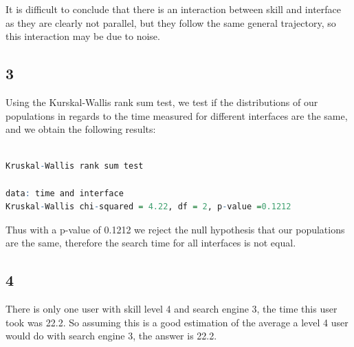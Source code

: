 \documentclass{article}
\begin{document}
	It is difficult to conclude that there is an interaction between skill and interface as they are clearly not parallel, but they follow the same general trajectory, so this interaction may be due to noise. 
    \subsection*{3}
    Using the Kurskal-Wallis rank sum test, we test if the distributions of our populations in regards to the time measured for different interfaces are the same, and we obtain the following results:\\\\
      \begin{lstlisting}[language=R]
Kruskal-Wallis rank sum test

data: time and interface
Kruskal-Wallis chi-squared = 4.22, df = 2, p-value =0.1212
      \end{lstlisting}
      Thus with a p-value of 0.1212 we reject the null hypothesis that our populations are the same, therefore the search time for all interfaces is not equal.
    \subsection*{4}
      There is only one user with skill level 4 and search engine 3, the time this user took was 22.2.
      So assuming this is a good estimation of the average a level 4 user would do with search engine 3,
      the answer is 22.2.
    
\end{document}

